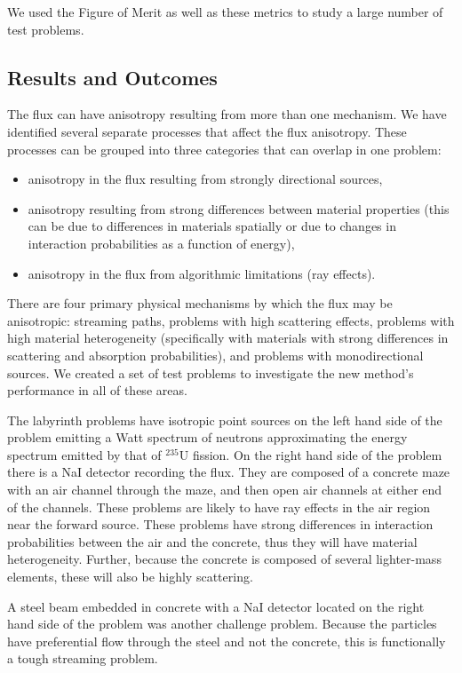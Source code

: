\documentclass[12pt]{article}
\begin{document}
We used the Figure of Merit as well as these metrics to study a large number of test problems. 

\subsection{Results and Outcomes}
\label{sect::results}

The flux can have anisotropy resulting from more than one
mechanism. We have identified several separate
processes that affect the flux anisotropy. These processes can be grouped into
three categories that can overlap in one problem:
\begin{itemize}
  \itemsep0em
  \item anisotropy in the flux resulting from strongly directional sources,
  \item anisotropy resulting from strong differences between
material properties (this can be due to differences in
materials spatially or due to changes in interaction probabilities as a function
of energy),
  \item anisotropy in the flux from algorithmic limitations (ray effects).
\end{itemize}
There are four primary physical mechanisms by which the flux may
be anisotropic: streaming paths, problems with high
scattering effects, problems with high material heterogeneity (specifically with
materials with strong differences in scattering and absorption probabilities),
and problems with monodirectional sources. We created a set of test problems to investigate the new method's performance in all of these areas.

The labyrinth problems have isotropic point sources on the left hand side of the
problem emitting a Watt spectrum of
neutrons approximating the energy spectrum emitted by that of $^{235}$U fission.
On the right hand side of the problem there is a NaI detector recording the flux.
They are composed of a concrete maze with an air channel through the maze, and
then open air channels at either end of the channels. These problems are 
likely to have ray effects in the air region near the forward source. These problems have strong
differences in interaction probabilities between the air and the concrete,
thus they will have material heterogeneity. Further, because the concrete is
composed of several lighter-mass elements, these will also be highly scattering.


A steel beam embedded in
concrete with a NaI detector located on the right hand side of the problem was another challenge problem.
Because the particles have preferential flow through the steel and not the concrete, this is functionally a tough streaming problem. 
\end{document}
